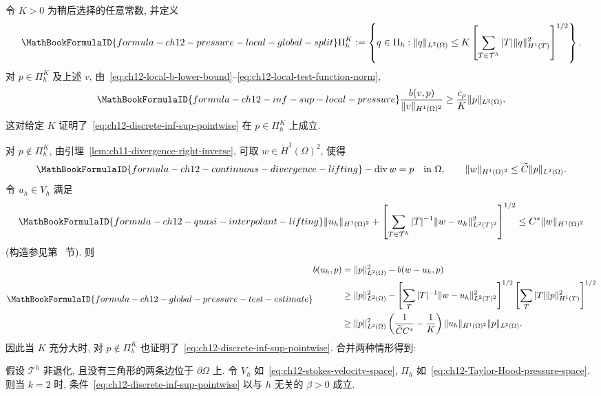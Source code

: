 令 $K>0$ 为稍后选择的任意常数, 并定义
\[
\MathBookFormulaID{formula-ch12-pressure-local-global-split}
\Pi_h^K:=\left\{q\in\Pi_h:
\|q\|_{L^2(\Omega)}
\leq K\left[\sum_{T\in\mathcal T^h}
|T|\|q\|_{H^1(T)}^2\right]^{1/2}\right\}.
\]
对 $p\in\Pi_h^K$ 及上述 $v$, 由~\eqref{eq:ch12-local-b-lower-bound}--\eqref{eq:ch12-local-test-function-norm},
\[
\MathBookFormulaID{formula-ch12-inf-sup-local-pressure}
\frac{b(v,p)}{\|v\|_{H^1(\Omega)^2}}
\geq\frac{c_\rho}{K}\|p\|_{L^2(\Omega)}.
\]
这对给定 $K$ 证明了~\eqref{eq:ch12-discrete-inf-sup-pointwise} 在 $p\in\Pi_h^K$ 上成立.

对 $p\notin\Pi_h^K$, 由引理~\ref{lem:ch11-divergence-right-inverse}, 可取 $w\in\mathring H^1(\Omega)^2$, 使得
\begin{equation}
\MathBookFormulaID{formula-ch12-continuous-divergence-lifting}
\label{eq:ch12-continuous-divergence-lifting}
-\operatorname{div}w=p\quad\text{in }\Omega,
\qquad
\|w\|_{H^1(\Omega)^2}\leq\widetilde C\|p\|_{L^2(\Omega)}.
\end{equation}
令 $u_h\in V_h$ 满足
\begin{equation}
\MathBookFormulaID{formula-ch12-quasi-interpolant-lifting}
\label{eq:ch12-quasi-interpolant-lifting}
\|u_h\|_{H^1(\Omega)^2}+
\left[\sum_{T\in\mathcal T^h}|T|^{-1}
\|w-u_h\|_{L^2(T)^2}^2\right]^{1/2}
\leq C^*\|w\|_{H^1(\Omega)^2}
\end{equation}
(构造参见第~ 节). 则
\[
\MathBookFormulaID{formula-ch12-global-pressure-test-estimate}
\begin{aligned}
b(u_h,p)
&=\|p\|_{L^2(\Omega)}^2-b(w-u_h,p)\\
&\geq\|p\|_{L^2(\Omega)}^2
-\left[\sum_T|T|^{-1}\|w-u_h\|_{L^2(T)^2}^2\right]^{1/2}
\left[\sum_T|T|\|p\|_{H^1(T)}^2\right]^{1/2}\\
&\geq\|p\|_{L^2(\Omega)}^2
\left(\frac1{\widetilde CC^*}-\frac1K\right)
\|u_h\|_{H^1(\Omega)^2}\|p\|_{L^2(\Omega)}.
\end{aligned}
\]
因此当 $K$ 充分大时, 对 $p\notin\Pi_h^K$ 也证明了~\eqref{eq:ch12-discrete-inf-sup-pointwise}. 合并两种情形得到:

\begin{Theorem}
\label{thm:ch12-Taylor-Hood-inf-sup-k2}
假设 $\mathcal T^h$ 非退化, 且没有三角形的两条边位于 $\partial\Omega$ 上. 令 $V_h$ 如~\eqref{eq:ch12-stokes-velocity-space}, $\Pi_h$ 如~\eqref{eq:ch12-Taylor-Hood-pressure-space}. 则当 $k=2$ 时, 条件~\eqref{eq:ch12-discrete-inf-sup-pointwise} 以与 $h$ 无关的 $\beta>0$ 成立.
\end{Theorem}

